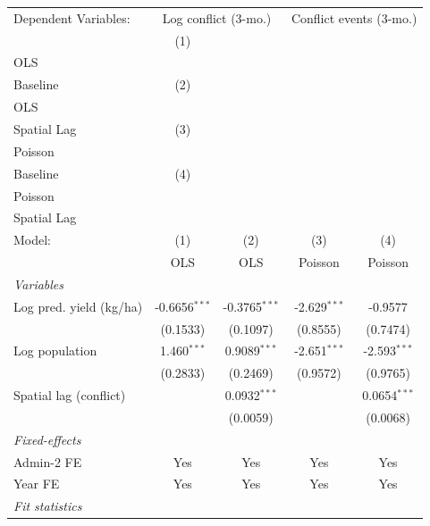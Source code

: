 
\begingroup
\centering
\begin{tabular}{lcccc}
   \tabularnewline \midrule \midrule
   Dependent Variables: & \multicolumn{2}{c}{Log conflict (3-mo.)} & \multicolumn{2}{c}{Conflict events (3-mo.)}\\
                           & (1)\\OLS\\Baseline     & (2)\\OLS\\Spatial Lag     & (3)\\Poisson\\Baseline     & (4)\\Poisson\\Spatial Lag \\       
   Model:                  & (1)                    & (2)                       & (3)                        & (4)\\  
                           &  OLS                   & OLS                       & Poisson                    & Poisson\\  
   \midrule
   \emph{Variables}\\
   Log pred. yield (kg/ha) & -0.6656$^{***}$        & -0.3765$^{***}$           & -2.629$^{***}$             & -0.9577\\   
                           & (0.1533)               & (0.1097)                  & (0.8555)                   & (0.7474)\\   
   Log population          & 1.460$^{***}$          & 0.9089$^{***}$            & -2.651$^{***}$             & -2.593$^{***}$\\   
                           & (0.2833)               & (0.2469)                  & (0.9572)                   & (0.9765)\\   
   Spatial lag (conflict)  &                        & 0.0932$^{***}$            &                            & 0.0654$^{***}$\\   
                           &                        & (0.0059)                  &                            & (0.0068)\\   
   \midrule
   \emph{Fixed-effects}\\
   Admin-2 FE              & Yes                    & Yes                       & Yes                        & Yes\\  
   Year FE                 & Yes                    & Yes                       & Yes                        & Yes\\  
   \midrule
   \emph{Fit statistics}\\

\end{tabular}

